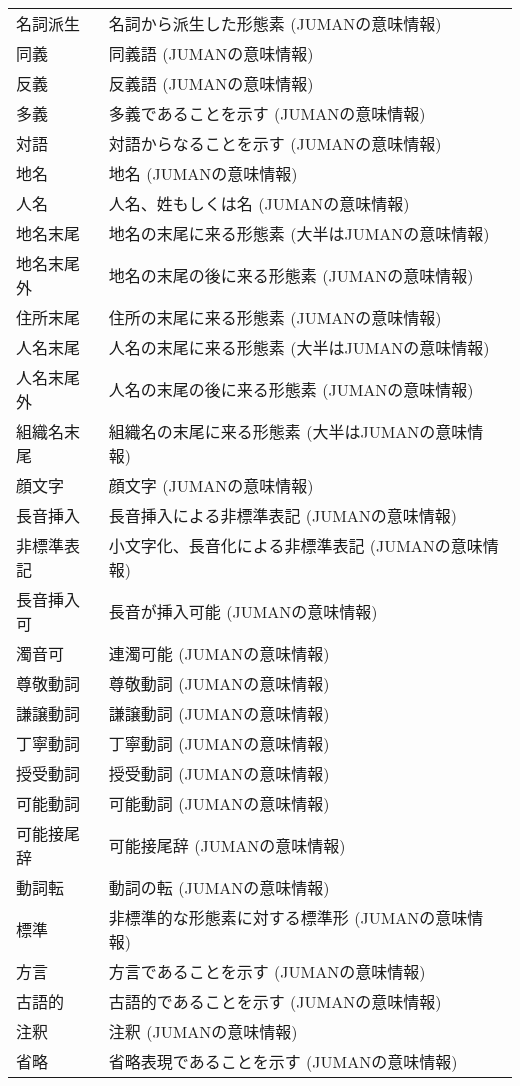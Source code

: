 \documentclass[a4j]{jarticle}
\begin{document}
\begin{supertabular}{p{4.2cm}p{9.6cm}}
名詞派生 & 名詞から派生した形態素 (JUMANの意味情報)\\
同義 & 同義語 (JUMANの意味情報)\\
反義 & 反義語 (JUMANの意味情報)\\
多義 & 多義であることを示す (JUMANの意味情報)\\
対語 & 対語からなることを示す (JUMANの意味情報)\\
地名 & 地名 (JUMANの意味情報)\\
人名 & 人名、姓もしくは名 (JUMANの意味情報)\\
地名末尾 & 地名の末尾に来る形態素 (大半はJUMANの意味情報)\\
地名末尾外 & 地名の末尾の後に来る形態素 (JUMANの意味情報)\\
住所末尾 & 住所の末尾に来る形態素 (JUMANの意味情報)\\
人名末尾 & 人名の末尾に来る形態素 (大半はJUMANの意味情報)\\
人名末尾外 & 人名の末尾の後に来る形態素 (JUMANの意味情報)\\
組織名末尾 & 組織名の末尾に来る形態素 (大半はJUMANの意味情報)\\
顔文字 & 顔文字 (JUMANの意味情報)\\
長音挿入 & 長音挿入による非標準表記 (JUMANの意味情報)\\
非標準表記 & 小文字化、長音化による非標準表記 (JUMANの意味情報)\\
長音挿入可 & 長音が挿入可能 (JUMANの意味情報)\\
濁音可 & 連濁可能 (JUMANの意味情報)\\
尊敬動詞 & 尊敬動詞 (JUMANの意味情報)\\
謙譲動詞 & 謙譲動詞 (JUMANの意味情報)\\
丁寧動詞 & 丁寧動詞 (JUMANの意味情報)\\
授受動詞 & 授受動詞 (JUMANの意味情報)\\
可能動詞 & 可能動詞 (JUMANの意味情報)\\
可能接尾辞 & 可能接尾辞 (JUMANの意味情報)\\
動詞転 & 動詞の転 (JUMANの意味情報)\\
標準 & 非標準的な形態素に対する標準形 (JUMANの意味情報)\\
方言 & 方言であることを示す (JUMANの意味情報)\\
古語的 & 古語的であることを示す (JUMANの意味情報)\\
注釈 & 注釈 (JUMANの意味情報)\\
省略 & 省略表現であることを示す (JUMANの意味情報)\\

\end{supertabular}
\end{document}
